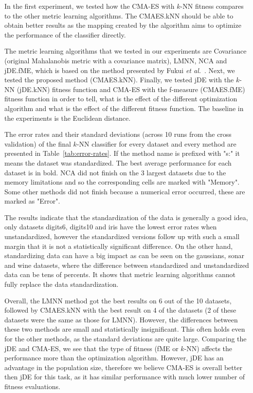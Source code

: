 In the first experiment, we tested how the CMA-ES with $k$-NN fitness compares to the other metric learning algorithms. The CMAES.kNN should be able to obtain better results as the mapping created by the algorithm aims to optimize the performance of the classifier directly. 

The metric learning algorithms that we tested in our experiments are Covariance (original Mahalanobis metric with a covariance matrix), LMNN, NCA and jDE.fME, which is based on the method presented by Fukui \emph{et al.}~\cite{fukui2013evolutionary}. Next, we tested the proposed method (CMAES.kNN). Finally, we tested jDE with the $k$-NN (jDE.kNN) fitness function and CMA-ES with the f-measure (CMAES.fME) fitness function in order to tell, what is the effect of the different optimization algorithm and what is the effect of the different fitness function. The baseline in the experiments is the Euclidean distance.

The error rates and their standard deviations (across 10 runs from the cross validation) of the final $k$-NN classifier for every dataset and every method are presented in Table~\ref{tab:error-rates}. If the method name is prefixed with "s:" it means the dataset was standardized. The best average performance for each dataset is in bold. NCA did not finish on the 3 largest datasets due to the memory limitations and so the corresponding cells are marked with "Memory". Some other methods did not finish because a numerical error occurred, these are marked as "Error".



The results indicate that the standardization of the data is generally a good idea, only datasets digits6, digits10 and iris have the lowest error rates when unstandardized, however the standardized versions follow up with such a small margin that it is not a statistically significant difference. On the other hand, standardizing data can have a big impact as can be seen on the gaussians, sonar and wine datasets, where the difference between standardized and unstandardized data can be tens of percents. It shows that metric learning algorithms cannot fully replace the data standardization.

Overall, the LMNN method got the best results on 6 out of the 10 datasets, followed by CMAES.kNN with the best result on 4 of the datasets (2 of these datasets were the same as those for LMNN). However, the differences between these two methods are small and statistically insignificant. This often holds even for the other methods, as the standard deviations are quite large. Comparing the jDE and CMA-ES, we see that the type of fitness (fME or $k$-NN) affects the performance more than the optimization algorithm. However, jDE has an advantage in the population size, therefore we believe CMA-ES is overall better then jDE for this task, as it has similar performance with much lower number of fitness evaluations.

